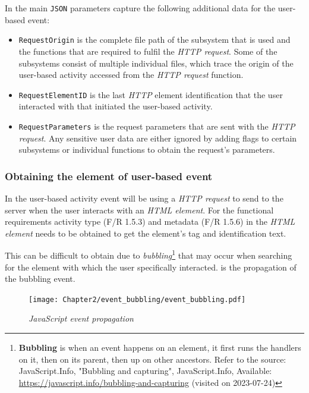 In  the main \texttt{JSON} parameters capture the following additional data for the user-based event:

\begin{itemize}
	\item \texttt{RequestOrigin} is the complete file path of the subsystem that is used and the functions that are required to fulfil the \textit{HTTP request}. Some of the subsystems consist of multiple individual files, which trace the origin of the user-based activity accessed from the \textit{HTTP request} function.
	\item \texttt{RequestElementID} is the last \textit{HTTP} element identification that the user interacted with that initiated the user-based activity.
	\item \texttt{RequestParameters} is the request parameters that are sent with the \textit{HTTP request}. Any sensitive user data are either ignored by adding flags to certain subsystems or individual functions to obtain the request's parameters.
\end{itemize}

\subsubsection{Obtaining the element of user-based event}\label{sec:ch3_ElementObtaining}
In  the user-based activity event will be using a \textit{HTTP request} to send to the server when the user interacts with an \textit{HTML element}. For the functional requirements activity type (F/R 1.5.3) and metadata (F/R 1.5.6) in  the \textit{HTML element} needs to be obtained to get the element's tag and identification text.\par This can be difficult to obtain due to \textit{bubbling}\footnote{\textbf{Bubbling} is when an event happens on an element, it first runs the handlers on it, then on its parent, then up on other ancestors. Refer to the source: JavaScript.Info, "Bubbling and capturing", JavaScript.Info, Available: \url{https://javascript.info/bubbling-and-capturing} (visited on 2023-07-24)} that may occur when searching for the element with which the user specifically interacted.  is the propagation of the bubbling event.

\begin{figure}[!htb]
	\centering %
	\texttt{[image: Chapter2/event\_bubbling/event\_bubbling.pdf]}
	\caption[JavaScript event propagation]
	{\textit{JavaScript event propagation}}\label{fig:ch2_event_bubbling}
\end{figure}

